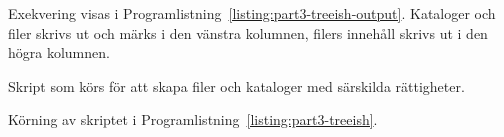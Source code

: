 Exekvering visas i Programlistning~\ref{listing:part3-treeish-output}. Kataloger
och filer skrivs ut och märks i den vänstra kolumnen, filers innehåll skrivs ut
i den högra kolumnen.

\begin{listing}[H]
\caption{Skript som körs för att skapa filer och kataloger med särskilda rättigheter.}
\label{listing:part3-treeish}
\end{listing}

\begin{listing}[H]
\caption{Körning av skriptet i Programlistning~\ref{listing:part3-treeish}.}
\label{listing:part3-treeish-output}
\end{listing}

